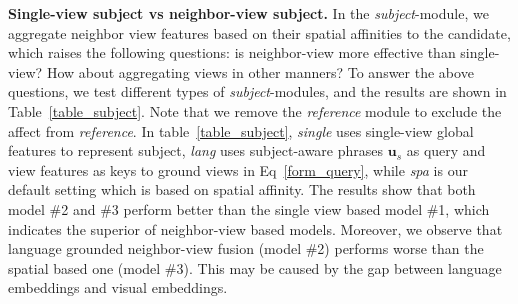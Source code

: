 \documentclass[sigconf]{acmart}
\begin{document}
\noindent\textbf{Single-view subject vs neighbor-view subject.} In the \textit{subject}-module, we aggregate neighbor view features based on their spatial affinities to the candidate, which raises the following questions: is neighbor-view more effective than single-view? How about aggregating views in other manners? 
To answer the above questions, we test different types of \textit{subject}-modules, and the results are shown in Table~\ref{table_subject}. Note that we remove the \textit{reference} module to exclude the affect from \textit{reference}.
In table~\ref{table_subject}, \textit{single} uses single-view global features to represent subject,
\textit{lang} uses subject-aware phrases $\mathbf{u}_s$ as query and view features as keys to ground views in Eq~\eqref{form_query}, while \textit{spa} is our default setting which is based on spatial affinity. 
The results show that both model \#2 and \#3 perform better than the single view based model \#1, which indicates the superior of neighbor-view based models. 
Moreover, we observe that language grounded neighbor-view fusion (model \#2) performs worse than the spatial based one (model \#3). This may be caused by the gap between language embeddings and visual embeddings.

\begin{table}[htbp]
	\caption{Different types of \textit{subject}-modules, \textit{single} denotes single-view, \textit{lang} denotes aggregating views using language as query while \textit{spa} denotes using spatial affinity.}
	\label{table_subject}
	\vspace{-3mm}
	\centering
\end{table}
\end{document}
